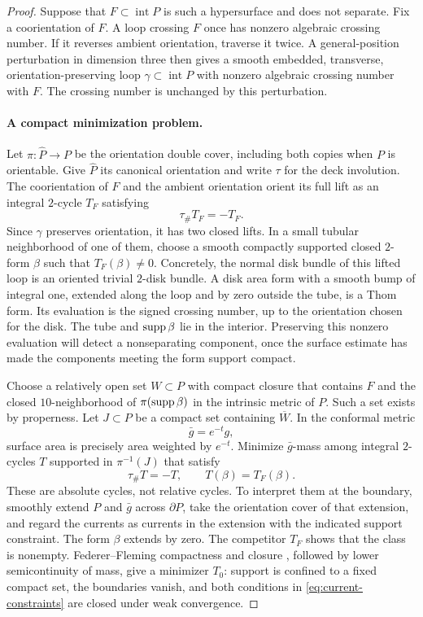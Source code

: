 \begin{proof}
Suppose that $F\subset\operatorname{int}P$ is such a hypersurface and
does not separate. Fix a coorientation of $F$. A loop crossing $F$ once
has nonzero algebraic crossing number. If it reverses ambient orientation,
traverse it twice. A general-position perturbation in dimension three
then gives a smooth embedded, transverse, orientation-preserving loop
$\gamma\subset\operatorname{int}P$ with nonzero algebraic crossing
number with $F$. The crossing number is unchanged by this perturbation.

\paragraph{A compact minimization problem.}
Let $\pi:\widehat P\to P$ be the orientation double cover, including
both copies when $P$ is orientable. Give $\widehat P$ its canonical
orientation and write $\tau$ for the deck involution. The coorientation
of $F$ and the ambient orientation orient its full lift as an integral
$2$-cycle $T_F$ satisfying
\[
\tau_\#T_F=-T_F.
\]
Since $\gamma$ preserves orientation, it has two closed lifts. In a small
tubular neighborhood of one of them, choose a smooth compactly supported
closed $2$-form $\beta$ such that $T_F(\beta)\ne0$. Concretely, the
normal disk bundle of this lifted loop is an oriented trivial $2$-disk
bundle. A disk area form with a smooth bump of integral one, extended
along the loop and by zero outside the tube, is a Thom form. Its
evaluation is the signed crossing number, up to the orientation chosen
for the disk. The tube and $\operatorname{supp}\beta$ lie in the interior.
Preserving this nonzero evaluation will detect a nonseparating component,
once the surface estimate has made the components meeting the form
support compact.

Choose a relatively open set $W\subset P$ with compact closure that
contains $F$ and the closed $10$-neighborhood of
$\pi(\operatorname{supp}\beta)$ in the intrinsic metric of $P$. Such a set exists
by properness. Let $J\subset P$ be a compact set containing $\overline W$.
In the conformal metric
\begin{equation}\label{eq:area-metric}
\bar g=e^{-t}g,
\end{equation}
surface area is precisely area weighted by $e^{-t}$. Minimize
$\bar g$-mass among integral $2$-cycles $T$ supported in $\pi^{-1}(J)$
that satisfy
\begin{equation}\label{eq:current-constraints}
\tau_\#T=-T,
\qquad T(\beta)=T_F(\beta).
\end{equation}
These are absolute cycles, not relative cycles. To interpret them at
the boundary, smoothly extend $P$ and $\bar g$ across $\partial P$,
take the orientation cover of that extension, and regard the currents
as currents in the extension with the indicated support constraint.
The form $\beta$ extends by zero. The competitor $T_F$ shows that the
class is nonempty. Federer--Fleming compactness and closure
\cite{FedererFleming1960}, followed
by lower semicontinuity of mass, give a minimizer $T_0$: support is
confined to a fixed compact set, the boundaries vanish, and both
conditions in \eqref{eq:current-constraints} are closed under weak
convergence.


\end{proof}
